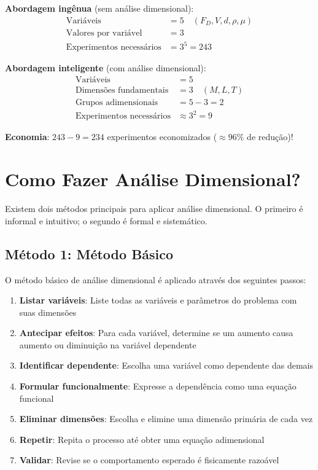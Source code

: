 \documentclass[12pt,a4paper,oneside]{book}
\theoremstyle{definition}
\begin{document}
\textbf{Abordagem ingênua} (sem análise dimensional):
\begin{align}
    \text{Variáveis} &= 5 \quad (F_D, V, d, \rho, \mu) \\
    \text{Valores por variável} &= 3 \\
    \text{Experimentos necessários} &= 3^5 = 243
\end{align}

\textbf{Abordagem inteligente} (com análise dimensional):
\begin{align}
    \text{Variáveis} &= 5 \\
    \text{Dimensões fundamentais} &= 3 \quad (M, L, T) \\
    \text{Grupos adimensionais} &= 5 - 3 = 2 \\
    \text{Experimentos necessários} &\approx 3^2 = 9
\end{align}

\textbf{Economia}: $243 - 9 = 234$ experimentos economizados ($\approx 96\%$ de redução)!

\section{Como Fazer Análise Dimensional?}

Existem dois métodos principais para aplicar análise dimensional. O primeiro é informal e intuitivo; o segundo é formal e sistemático.

\subsection{Método 1: Método Básico}

O método básico de análise dimensional é aplicado através dos seguintes passos:

\begin{enumerate}
    \item \textbf{Listar variáveis}: Liste todas as variáveis e parâmetros do problema com suas dimensões
    \item \textbf{Antecipar efeitos}: Para cada variável, determine se um aumento causa aumento ou diminuição na variável dependente
    \item \textbf{Identificar dependente}: Escolha uma variável como dependente das demais
    \item \textbf{Formular funcionalmente}: Expresse a dependência como uma equação funcional
    \item \textbf{Eliminar dimensões}: Escolha e elimine uma dimensão primária de cada vez
    \item \textbf{Repetir}: Repita o processo até obter uma equação adimensional
    \item \textbf{Validar}: Revise se o comportamento esperado é fisicamente razoável
\end{enumerate}
\end{document}
